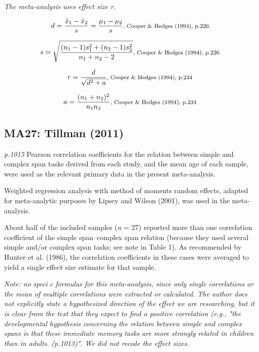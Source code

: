 \documentclass{article}
\begin{document}
\vspace{3mm}
\textit{The meta-analysis uses effect size r.}

\begin{equation*}
d={\frac {{\bar {x}}_{1}-{\bar {x}}_{2}}{s}}={\frac {\mu_{1}-\mu_{2}}{s}} \mbox{\footnotesize, Cooper \& Hedges (1994), p.226 } 
\end{equation*}

\begin{equation*}
s={\sqrt {\frac {(n_{1}-1)s_{1}^{2}+(n_{2}-1)s_{2}^{2}}{n_{1}+n_{2}-2}}} \mbox{\footnotesize, Cooper \& Hedges (1994), p.226 } 
\end{equation*}

\begin{equation*}
r=\frac{d}{\sqrt{d^{2}+a}} \mbox{\footnotesize, Cooper \& Hedges (1994), p.234 }
\end{equation*}

\begin{equation*}
a=\frac{(n_{1}+n_{2})^{2}}{n_{1}n_{2}} \mbox{\footnotesize, Cooper \& Hedges (1994), p.234 }
\end{equation*}

\subsection*{MA27: Tillman (2011)}

\textit{p.1015} Pearson correlation coefficients for the relation between simple and complex span tasks derived from each study, and the mean age of each sample, were used as the relevant primary data in the present meta-analysis.

Weighted regression analysis with method of moments random effects, adapted for meta-analytic purposes by Lipsey and Wilson
(2001), was used in the meta-analysis.

About half of the included samples (\textit{n} = 27) reported more than one correlation coefficient of the simple span–complex span relation (because they used several simple and/or complex span tasks; see note in Table 1). As recommended by Hunter et al. (1986), the correlation coefficients in these cases were averaged to yield a single effect size estimate for that sample.

\vspace{3 mm}
\textit{Note: no specic formulas for this meta-analysis, since only single correlations or the mean of multiple correlations were extracted or calculated. The author does not explicitly state a hypothesized direction of the effect we are researching, but it is clear from the text that they expect to find a positive correlation (e.g., "the developmental hypothesis concerning the relation between simple and complex spans is that these immediate memory tasks are more strongly related in children than in adults. (p.1013)". We did not recode the effect sizes. }
\end{document}
